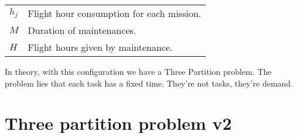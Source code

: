 \documentclass[a4paper,11pt]{article}
\begin{document}
    \begin{tabular}{ll}
    	$h_j$ & Flight hour consumption for each mission.\\
    	$M$ & Duration of maintenances.\\
    	$H$ & Flight hours given by maintenance.\\
    \end{tabular}

    In theory, with this configuration we have a Three Partition problem. The problem lies that each task has a fixed time. They're not tasks, they're demand. 		




\clearpage
\section{Three partition problem v2}
\end{document}
